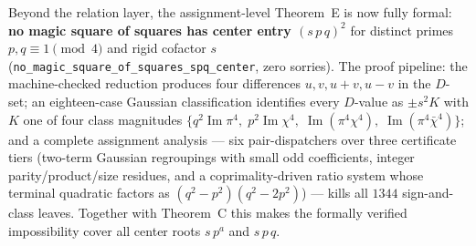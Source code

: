 \documentclass[11pt]{article}
\theoremstyle{remark}
\DeclareMathOperator{\im}{Im}
\begin{document}
Beyond the relation layer, the assignment-level Theorem~E is now fully
formal: \textbf{no magic square of squares has center entry
$(s\,p\,q)^2$} for distinct primes $p, q \equiv 1 \pmod 4$ and rigid
cofactor $s$ (\texttt{no\_magic\_square\_of\_squares\_spq\_center},
zero sorries).  The proof pipeline: the machine-checked reduction
produces four differences $u, v, u{+}v, u{-}v$ in the $D$-set; an
eighteen-case Gaussian classification identifies every $D$-value as
$\pm s^2 K$ with $K$ one of four class magnitudes
$\{q^2\im\pi^4,\; p^2\im\chi^4,\; \im(\pi^4\chi^4),\;
\im(\pi^4\bar\chi^4)\}$; and a complete assignment analysis — six
pair-dispatchers over three certificate tiers (two-term Gaussian
regroupings with small odd coefficients, integer parity/product/size
residues, and a coprimality-driven ratio system whose terminal
quadratic factors as $(q^2-p^2)(q^2-2p^2)$) — kills all $1344$
sign-and-class leaves.  Together with Theorem~C this makes the
formally verified impossibility cover all center roots $s\,p^a$ and
$s\,p\,q$.
\end{document}
